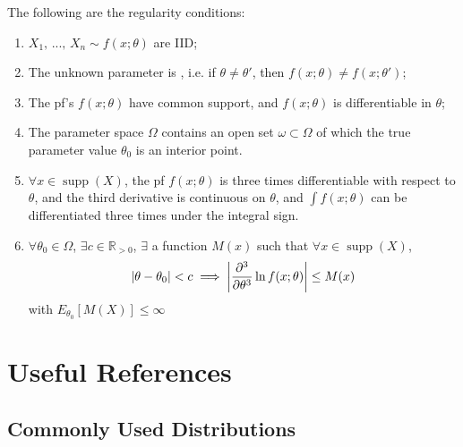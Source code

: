 \documentclass[notoc,notitlepage]{tufte-book}
\DeclareMathOperator{\supp}{supp }
\begin{document}
The following are the regularity conditions:

\begin{enumerate}
  \item $X_1, \, ..., \, X_n \sim f(x ; \theta)$ are IID;
  \item The unknown parameter is , i.e. if $\theta \neq \theta'$, then $f(x ; \theta) \neq f(x; \theta')$;
  \item The pf's $f(x; \theta)$ have common support, and $f(x; \theta)$ is differentiable in $\theta$;
  \item The parameter space $\Omega$ contains an open set $\omega \subset \Omega$ of which the true parameter value $\theta_0$ is an interior point.
  \item $\forall x \in \supp(X)$, the pf $f(x; \theta)$ is three times differentiable with respect to $\theta$, and the third derivative is continuous on $\theta$, and $\int f(x; \theta)$ can be differentiated three times under the integral sign.
  \item $\forall \theta_0 \in \Omega$, $\exists c \in \mathbb{R}_{> 0}$, $\exists$ a function $M(x)$  such that $\forall x \in \supp(X)$,
    \begin{equation*}
      \left|\theta - \theta_0\right| < c \implies \left|\frac{\partial^3}{\partial \theta^3} \ln f(x; \theta)\right| \leq M(x)
    \end{equation*}
    with $E_{\theta_0}[M(X)] \leq \infty$ 
\end{enumerate}


\chapter{Useful References}%
\label{chp:appendix}

\section{Commonly Used Distributions}%
\label{sec:commonly_used_distributions}
\end{document}
